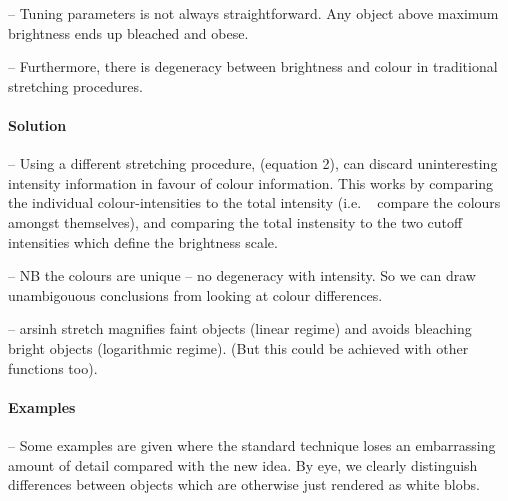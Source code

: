 \documentclass[letterpaper, 11pt]{article}
\begin{document}
-- Tuning parameters is not always straightforward. Any object above maximum brightness ends up bleached and obese.

-- Furthermore, there is degeneracy between brightness and colour in traditional stretching procedures.


\paragraph{Solution}

-- Using a different stretching procedure, (equation 2), can discard uninteresting intensity information in favour of colour information. This works by comparing the individual colour-intensities to the total intensity (i.e. ~ compare the colours amongst themselves), and comparing the total instensity to the two cutoff intensities which define the brightness scale.

-- NB the colours are unique -- no degeneracy with intensity. So we can draw unambigouous conclusions from looking at colour differences.

-- arsinh stretch magnifies faint objects (linear regime) and avoids bleaching bright objects (logarithmic regime). (But this could be achieved with other functions too).


\paragraph{Examples}

-- Some examples are given where the standard technique loses an embarrassing amount of detail compared with the new idea. By eye, we clearly distinguish differences between objects which are otherwise just rendered as white blobs.


\newpage
{}


\end{document}
